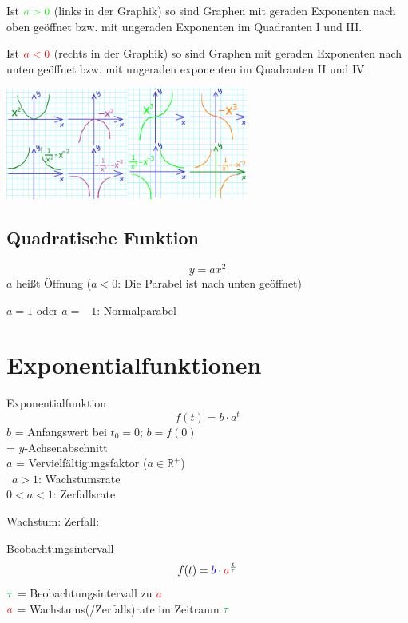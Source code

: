 \begin{multicols}{2}
Ist ${\color{green}a>0}$ (links in der Graphik) so sind Graphen mit
geraden Exponenten nach oben geöffnet bzw. mit ungeraden Exponenten im
Quadranten I und III.

Ist ${\color{red}a<0}$ (rechts in der Graphik) so sind Graphen mit
geraden Exponenten nach unten geöffnet bzw. mit ungeraden exponenten
im Quadranten II und IV.

 \includegraphics[width=4cm]{img/potenzFunktionenGerade.png}\hfill{}\includegraphics[width=4cm]{img/potenzFunktionenUngerade.png}


\hrulefill  
\subsection*{Quadratische Funktion}
$$y=ax^2$$
$a$ heißt Öffnung ($a<0$: Die Parabel ist nach unten geöffnet)

$a=1$ oder $a=-1$: Normalparabel

\hrulefill
\section*{Exponentialfunktionen}
\begin{definition*}{Exponentialfunktion}{}
$$f(t) = b\cdot{}a^t$$
$b$ = Anfangswert bei $t_0=0$; $b=f(0)$\\
\phantom{$b$} = $y$-Achsenabschnitt\\
$a$ = Vervielfältigungsfaktor ($a\in\mathbb{R}^{+}$)\\\
$a>1$: Wachstumsrate\\
$0<a<1$: Zerfallsrate
\end{definition*}

Wachstum:
Zerfall:
\begin{rezept*}{Beobachtungsintervall}{}
$$f(t) = {\color{blue}b}\cdot{}{\color{red}a}^{\frac{t}{\color{ForestGreen}\tau}}$$
$\color{ForestGreen}\tau$ = Beobachtungsintervall zu $\color{red}a$\\
$\color{red}a$ = Wachstums(/Zerfalls)rate im Zeitraum $\color{ForestGreen}\tau$


\end{rezept*}
\end{multicols}
